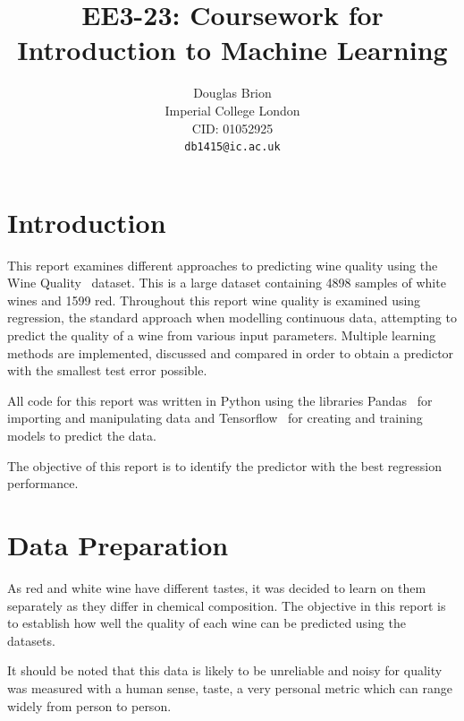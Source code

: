 \documentclass[10pt,twocolumn,letterpaper]{article}
\begin{document}
\title{EE3-23: Coursework for Introduction to Machine Learning}

\author{Douglas Brion\\
Imperial College London\\
CID: 01052925\\
{\tt\small db1415@ic.ac.uk}
}

\maketitle


\section{Introduction}

This report examines different approaches to predicting wine quality using the Wine Quality~\cite{WineQuality} dataset. This is a large dataset containing 4898 samples of white wines and 1599 red. Throughout this report wine quality is examined using regression, the standard approach when modelling continuous data, attempting to predict the quality of a wine from various input parameters. Multiple learning methods are implemented, discussed and compared in order to obtain a predictor with the smallest test error possible.

All code for this report was written in Python using the libraries Pandas~\cite{mckinneypandas} for importing and manipulating data and Tensorflow~\cite{tensorflow2015-whitepaper} for creating and training models to predict the data.

The objective of this report is to identify the predictor with the best regression performance.

\section{Data Preparation}
As red and white wine have different tastes, it was decided to learn on them separately as they differ in chemical composition. The objective in this report is to establish how well the quality of each wine can be predicted using the datasets.

It should be noted that this data is likely to be unreliable and noisy for quality was measured with a human sense, taste, a very personal metric which can range widely from person to person.
\end{document}
